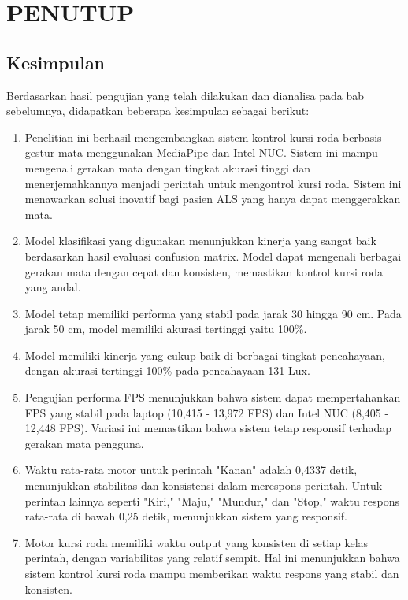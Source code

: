 \chapter{PENUTUP}
\label{chap:penutup}


\section{Kesimpulan}
\label{sec:kesimpulan}

Berdasarkan hasil pengujian yang telah dilakukan dan dianalisa pada bab sebelumnya, didapatkan beberapa kesimpulan sebagai berikut:

\begin{enumerate}[nolistsep]

  \item Penelitian ini berhasil mengembangkan sistem kontrol kursi roda berbasis gestur mata menggunakan MediaPipe dan Intel NUC. Sistem ini mampu mengenali gerakan mata dengan tingkat akurasi tinggi dan menerjemahkannya menjadi perintah untuk mengontrol kursi roda. Sistem ini menawarkan solusi inovatif bagi pasien ALS yang hanya dapat menggerakkan mata.

  \item Model klasifikasi yang digunakan menunjukkan kinerja yang sangat baik berdasarkan hasil evaluasi confusion matrix. Model dapat mengenali berbagai gerakan mata dengan cepat dan konsisten, memastikan kontrol kursi roda yang andal.

  \item Model tetap memiliki performa yang stabil pada jarak 30 hingga 90 cm. Pada jarak 50 cm, model memiliki akurasi tertinggi yaitu 100\%.
  
  \item Model memiliki kinerja yang cukup baik di berbagai tingkat pencahayaan, dengan akurasi tertinggi 100\% pada pencahayaan 131 Lux.
  
  \item Pengujian performa FPS menunjukkan bahwa sistem dapat mempertahankan FPS yang stabil pada laptop (10,415 - 13,972 FPS) dan Intel NUC (8,405 - 12,448 FPS). Variasi ini memastikan bahwa sistem tetap responsif terhadap gerakan mata pengguna.
  
  \item Waktu rata-rata motor untuk perintah "Kanan" adalah 0,4337 detik, menunjukkan stabilitas dan konsistensi dalam merespons perintah. Untuk perintah lainnya seperti "Kiri," "Maju," "Mundur," dan "Stop," waktu respons rata-rata di bawah 0,25 detik, menunjukkan sistem yang responsif.
  
  \item Motor kursi roda memiliki waktu output yang konsisten di setiap kelas perintah, dengan variabilitas yang relatif sempit. Hal ini menunjukkan bahwa sistem kontrol kursi roda mampu memberikan waktu respons yang stabil dan konsisten.

\end{enumerate}

